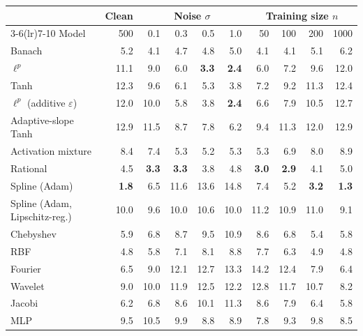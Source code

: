 \begin{tabular}{lrrrrrrrrr}
\toprule
& Clean & \multicolumn{4}{c}{Noise $\sigma$} & \multicolumn{4}{c}{Training size $n$} \\
\cmidrule(lr){3-6}\cmidrule(lr){7-10}
Model & 500 & 0.1 & 0.3 & 0.5 & 1.0 & 50 & 100 & 200 & 1000 \\
\midrule
Banach & 5.2 & 4.1 & 4.7 & 4.8 & 5.0 & 4.1 & 4.1 & 5.1 & 6.2 \\
$\ell^p$ & 11.1 & 9.0 & 6.0 & \textbf{3.3} & \textbf{2.4} & 6.0 & 7.2 & 9.6 & 12.0 \\
\midrule
Tanh & 12.3 & 9.6 & 6.1 & 5.3 & 3.8 & 7.2 & 9.2 & 11.3 & 12.4 \\
$\ell^p$ (additive $\varepsilon$) & 12.0 & 10.0 & 5.8 & 3.8 & \textbf{2.4} & 6.6 & 7.9 & 10.5 & 12.7 \\
Adaptive-slope Tanh & 12.9 & 11.5 & 8.7 & 7.8 & 6.2 & 9.4 & 11.3 & 12.0 & 12.9 \\
Activation mixture & 8.4 & 7.4 & 5.3 & 5.2 & 5.3 & 5.3 & 6.9 & 8.0 & 8.9 \\
Rational & 4.5 & \textbf{3.3} & \textbf{3.3} & 3.8 & 4.8 & \textbf{3.0} & \textbf{2.9} & 4.1 & 5.0 \\
Spline (Adam) & \textbf{1.8} & 6.5 & 11.6 & 13.6 & 14.8 & 7.4 & 5.2 & \textbf{3.2} & \textbf{1.3} \\
Spline (Adam, Lipschitz-reg.) & 10.0 & 9.6 & 10.0 & 10.6 & 10.0 & 11.2 & 10.9 & 11.0 & 9.1 \\
Chebyshev & 5.9 & 6.8 & 8.7 & 9.5 & 10.9 & 8.6 & 6.8 & 5.4 & 5.8 \\
RBF & 4.8 & 5.8 & 7.1 & 8.1 & 8.8 & 7.7 & 6.3 & 4.9 & 4.8 \\
Fourier & 6.5 & 9.0 & 12.1 & 12.7 & 13.3 & 14.2 & 12.4 & 7.9 & 6.4 \\
Wavelet & 9.0 & 10.0 & 11.9 & 12.5 & 12.2 & 12.8 & 11.7 & 10.7 & 8.2 \\
Jacobi & 6.2 & 6.8 & 8.6 & 10.1 & 11.3 & 8.6 & 7.9 & 6.4 & 5.8 \\
MLP & 9.5 & 10.5 & 9.9 & 8.8 & 8.9 & 7.8 & 9.3 & 9.8 & 8.5 \\
\bottomrule
\end{tabular}
